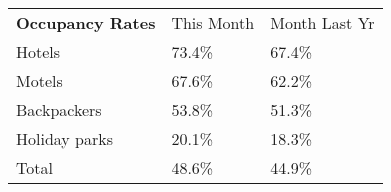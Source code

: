 \begin{tabular}[t]{p{4.8cm}>{\hfill}p{1.3cm}>{\hfill}p{1.4cm}}
 \textbf{Occupancy Rates} & This Month & Month Last Yr \\ 
 Hotels & 73.4\% & 67.4\% \\ 
  Motels & 67.6\% & 62.2\% \\ 
  Backpackers & 53.8\% & 51.3\% \\ 
  Holiday parks & 20.1\% & 18.3\% \\ 
  Total & 48.6\% & 44.9\% \\ 
  \end{tabular}
